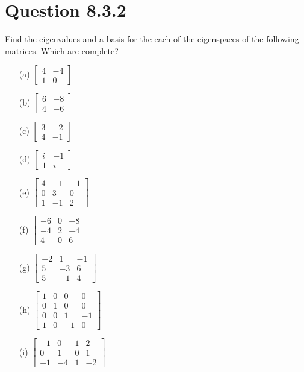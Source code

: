 \documentclass[12pt]{article}
\begin{document}
\newpage
\section*{Question 8.3.2}
Find the eigenvalues and a basis for the each of the eigenspaces of the following matrices. Which are complete?
\begin{itemize}
    \item[(a)] \( \begin{bmatrix} 4 & -4 \\ 1 & 0 \end{bmatrix} \)
    \item[(b)] \( \begin{bmatrix} 6 & -8 \\ 4 & -6 \end{bmatrix} \)
    \item[(c)] \( \begin{bmatrix} 3 & -2 \\ 4 & -1 \end{bmatrix} \)
    \item[(d)] \( \begin{bmatrix} i & -1 \\ 1 & i \end{bmatrix} \)
    \item[(e)] \( \begin{bmatrix} 4 & -1 & -1 \\ 0 & 3 & 0 \\ 1 & -1 & 2 \end{bmatrix} \)
    \item[(f)] \( \begin{bmatrix} -6 & 0 & -8 \\ -4 & 2 & -4 \\ 4 & 0 & 6 \end{bmatrix} \)
    \item[(g)] \( \begin{bmatrix} -2 & 1 & -1 \\ 5 & -3 & 6 \\ 5 & -1 & 4 \end{bmatrix} \)
    \item[(h)] \( \begin{bmatrix} 1 & 0 & 0 & 0 \\ 0 & 1 & 0 & 0 \\ 0 & 0 & 1 & -1 \\ 1 & 0 & -1 & 0 \end{bmatrix} \)
    \item[(i)] \( \begin{bmatrix} -1 & 0 & 1 & 2 \\ 0 & 1 & 0 & 1 \\ -1 & -4 & 1 & -2 \end{bmatrix} \)
\end{itemize}
\end{document}
